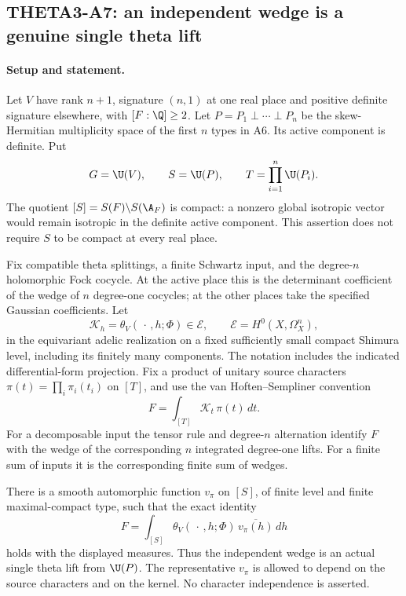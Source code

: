 
\subsection{THETA3-A7: an independent wedge is a genuine single theta lift}\label{A7}

\paragraph{Setup and statement.}
Let $V$ have rank $n+1$, signature $(n,1)$ at one real place and
positive definite signature elsewhere, with $[F:\Q]\geq2$.
Let $P=P_1\perp\cdots\perp P_n$ be the skew-Hermitian multiplicity
space of the first $n$ types in A6. Its active component is definite.
Put
\[
 G=\U(V),\qquad S=\U(P),\qquad T=\prod_{i=1}^n\U(P_i).
\]
The quotient $[S]=S(F)\backslash S(\A_F)$ is compact: a nonzero
global isotropic vector would remain isotropic in the definite
active component. This assertion does not require $S$ to be compact
at every real place.

Fix compatible theta splittings, a finite Schwartz input, and the
degree-$n$ holomorphic Fock cocycle. At the active place this is
the determinant coefficient of the wedge of $n$ degree-one
cocycles; at the other places take the specified Gaussian
coefficients. Let
\[
 \mathcal K_h=\theta_V(\,\cdot\,,h;\Phi)\in\mathcal E,\qquad
 \mathcal E=H^0(X,\Omega_X^n),
\]
in the equivariant adelic realization on a fixed sufficiently small
compact Shimura level, including its finitely many components.
The notation includes the indicated differential-form projection.
Fix a product of unitary source characters
$\pi(t)=\prod_i\pi_i(t_i)$ on $[T]$, and use the
van Hoften--Sempliner convention
\[
 F=\int_{[T]}\mathcal K_t\,\pi(t)\,dt.
\]
For a decomposable input the tensor rule and degree-$n$ alternation
identify $F$ with the wedge of the corresponding $n$ integrated
degree-one lifts. For a finite sum of inputs it is the corresponding
finite sum of wedges.

There is a smooth automorphic function $v_\pi$ on $[S]$, of finite
level and finite maximal-compact type, such that the exact identity
\begin{equation}\label{A7-lift}
 F=\int_{[S]}\theta_V(\,\cdot\,,h;\Phi)\,
                                  \overline{v_\pi(h)}\,dh
\end{equation}
holds with the displayed measures. Thus the independent wedge is
an actual single theta lift from $\U(P)$. The representative
$v_\pi$ is allowed to depend on the source characters and on the
kernel. No character independence is asserted.

